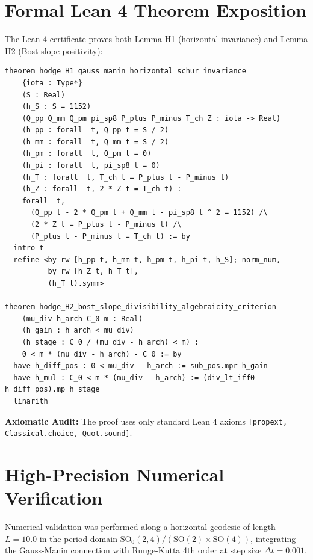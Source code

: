 \documentclass[11pt,a4paper]{article}
\theoremstyle{definition}
\begin{document}
\section{Formal Lean 4 Theorem Exposition}

The Lean 4 certificate proves both Lemma H1 (horizontal invariance) and Lemma H2 (Bost slope positivity):

\begin{lstlisting}[language=Lean4]
theorem hodge_H1_gauss_manin_horizontal_schur_invariance
    {iota : Type*}
    (S : Real)
    (h_S : S = 1152)
    (Q_pp Q_mm Q_pm pi_sp8 P_plus P_minus T_ch Z : iota -> Real)
    (h_pp : forall  t, Q_pp t = S / 2)
    (h_mm : forall  t, Q_mm t = S / 2)
    (h_pm : forall  t, Q_pm t = 0)
    (h_pi : forall  t, pi_sp8 t = 0)
    (h_T : forall  t, T_ch t = P_plus t - P_minus t)
    (h_Z : forall  t, 2 * Z t = T_ch t) :
    forall  t,
      (Q_pp t - 2 * Q_pm t + Q_mm t - pi_sp8 t ^ 2 = 1152) /\
      (2 * Z t = P_plus t - P_minus t) /\
      (P_plus t - P_minus t = T_ch t) := by
  intro t
  refine <by rw [h_pp t, h_mm t, h_pm t, h_pi t, h_S]; norm_num,
          by rw [h_Z t, h_T t],
          (h_T t).symm>

theorem hodge_H2_bost_slope_divisibility_algebraicity_criterion
    (mu_div h_arch C_0 m : Real)
    (h_gain : h_arch < mu_div)
    (h_stage : C_0 / (mu_div - h_arch) < m) :
    0 < m * (mu_div - h_arch) - C_0 := by
  have h_diff_pos : 0 < mu_div - h_arch := sub_pos.mpr h_gain
  have h_mul : C_0 < m * (mu_div - h_arch) := (div_lt_iff0 h_diff_pos).mp h_stage
  linarith
\end{lstlisting}

\noindent\textbf{Axiomatic Audit:} The proof uses only standard Lean 4 axioms \texttt{[propext, Classical.choice, Quot.sound]}.


\section{High-Precision Numerical Verification}

Numerical validation was performed along a horizontal geodesic of length $L = 10.0$ in the period domain $\mathrm{SO}_0(2,4)/(\mathrm{SO}(2)\times\mathrm{SO}(4))$, integrating the Gauss-Manin connection with Runge-Kutta 4th order at step size $\Delta t = 0.001$.
\end{document}
